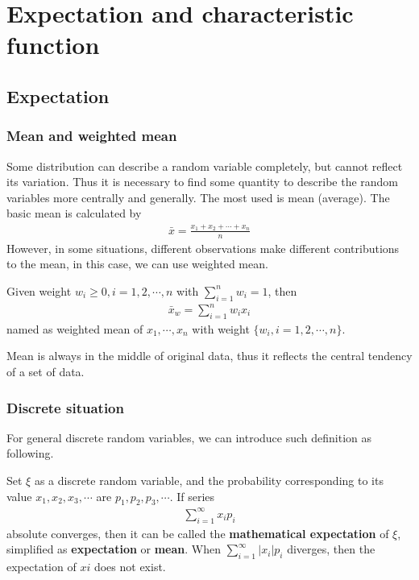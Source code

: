 \section{Expectation and characteristic function}

\subsection{Expectation}

\subsubsection{Mean and weighted mean}

Some distribution can describe a random variable completely, but cannot reflect its variation. Thus it is necessary to find some quantity to describe the random variables more centrally and generally. The most used is mean (average). The basic mean is calculated by
\begin{align*}
    \bar{x} = \frac{x_1 +x_2+\cdots + x_n}{n}
\end{align*}
However, in some situations, different observations make different contributions to the mean, in this case, we can use weighted mean.
\begin{defn}
    Given weight $w_i \geq 0,i=1,2,\cdots,n$ with $\sum_{i=1}^n w_i=1$, then
    \begin{align}
        \bar{x}_w = \sum_{i=1}^n w_ix_i
    \end{align}
    named as weighted mean of $x_1,\cdots,x_n$ with weight $\{w_i,i=1,2,\cdots,n\}$.
\end{defn}

Mean is always in the middle of original data, thus it reflects the central tendency of a set of data.

\subsubsection{Discrete situation}
For general discrete random variables, we can introduce such definition as following.
\begin{defn}
    Set $\xi$ as a discrete random variable, and the probability corresponding to its value $x_1,x_2,x_3,\cdots$ are $p_1,p_2,p_3,\cdots$. If series
    \begin{align}
        \sum_{i=1}^\infty x_ip_i
    \end{align}
    absolute converges, then it can be called the \textbf{mathematical expectation} of $\xi$, simplified as \textbf{expectation} or \textbf{mean}.
    When $\sum_{i=1}^\infty |x_i|p_i$ diverges, then the expectation of $xi$ does not exist.
\end{defn}

